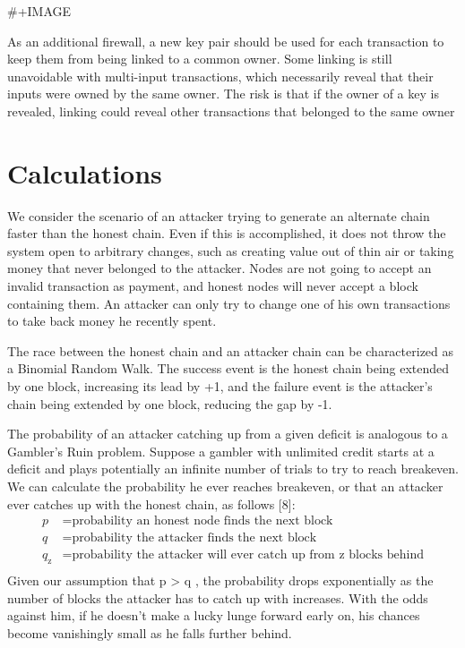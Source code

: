 \documentclass[11pt]{article}
\begin{document}
\#+IMAGE

As an additional firewall, a new key pair should be used for each transaction to keep them from being linked to a common owner.
Some linking is still unavoidable with multi-input transactions, which necessarily reveal that their inputs were owned by the same owner.
The risk is that if the owner of a key is revealed, linking could reveal other transactions that belonged to the same owner

\section{Calculations}
\label{sec:org9387775}
We consider the scenario of an attacker trying to generate an alternate chain faster than the honest chain.
Even if this is accomplished, it does not throw the system open to arbitrary changes, such as creating value out of thin air or taking money that never belonged to the attacker.
Nodes are not going to accept an invalid transaction as payment, and honest nodes will never accept a block containing them.
An attacker can only try to change one of his own transactions to take back money he recently spent.

The race between the honest chain and an attacker chain can be characterized as a Binomial Random Walk.
The success event is the honest chain being extended by one block, increasing its lead by +1, and the failure event is the attacker's chain being extended by one block, reducing the gap by -1.

The probability of an attacker catching up from a given deficit is analogous to a Gambler's Ruin problem.
Suppose a gambler with unlimited credit starts at a deficit and plays potentially an infinite number of trials to try to reach breakeven.
We can calculate the probability he ever reaches breakeven, or that an attacker ever catches up with the honest chain, as follows [8]:
\begin{align*}
    p &= \text{probability an honest node finds the next block} \\
    q &= \text{probability the attacker finds the next block} \\
    q_{\text{z}} &= \text{probability the attacker will ever catch up from z blocks behind} \\
\end{align*}
Given our assumption that p > q , the probability drops exponentially as the number of blocks the attacker has to catch up with increases.
With the odds against him, if he doesn't make a lucky lunge forward early on, his chances become vanishingly small as he falls further behind.
\end{document}
